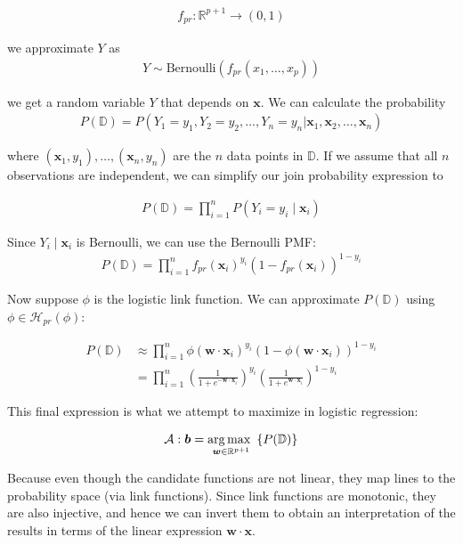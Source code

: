 \documentclass[12pt]{article}
\begin{document}
\begin{enumerate}
\begin{align*}
	f_{pr}:\mathbb{R}^{p+1}\to (0, 1)
\end{align*}

we approximate $Y$ as
\begin{align*}
	Y \sim \text{Bernoulli}(f_{pr}(x_1,\ldots,x_p))
\end{align*}

we get a random variable $Y$ that depends on $\bm{x}$. We can calculate
the probability
\begin{align*}
	P(\mathbb{D}) = P(Y_1 = y_1, Y_2 = y_2, \ldots, Y_n = y_n | \bm{x}_1,\bm{x}_2,\ldots,\bm{x}_n)
\end{align*}

where $(\bm{x}_1, y_1),\ldots,(\bm{x}_n, y_n)$ are the $n$ data points in
$\mathbb{D}$. If we assume that all $n$ observations are independent,
we can simplify our join probability expression to

\begin{align*}
	P(\mathbb{D}) = \prod_{i=1}^{n}P(Y_i = y_i \mid \bm{x}_i)
\end{align*}

Since $Y_i\mid \bm{x}_i$ is Bernoulli, we can use the Bernoulli PMF:
\begin{align*}
	P(\mathbb{D}) = \prod_{i=1}^{n}f_{pr}(\bm{x}_i)^{y_i}(1 - f_{pr}(\bm{x}_i))^{1-y_i}
\end{align*}

Now suppose $\phi$ is the logistic link function. We can approximate
$P(\mathbb{D})$ using $\phi\in \mathcal{H}_{pr}(\phi)$:

\begin{align*}
	P(\mathbb{D})
	&\approx \prod_{i=1}^{n}\phi(\bm{w}\cdot \bm{x}_i)^{y_i}(1 - \phi(\bm{w}\cdot \bm{x}_i))^{1-y_i}\\
	&=\prod_{i=1}^{n}
	\left(
		\frac{1}{1 + e^{-\bm{w}\cdot \bm{x}_i}}
	\right)^{y_i}
	\left(
	\frac{1}{1 + e^{\bm{w}\cdot \bm{x}_i}}
	\right)^{1-y_i}
\end{align*}

This final expression is what we attempt to maximize in logistic regression:

\begin{align*}
	\mathcal{A} : \boldsymbol{b} = \operatorname*{arg\,max~}_{\boldsymbol{w} \in \mathbb{R}^{p+1}}\left\{P(\mathbb{D})\right\}
\end{align*}


Because even though the candidate functions are not linear, they map lines to the
probability space (via link functions). Since link functions are monotonic,
they are also injective, and hence we can invert them to obtain an interpretation
of the results in terms of the linear expression $\bm{w}\cdot\bm{x}$.


\end{enumerate}
\end{document}
